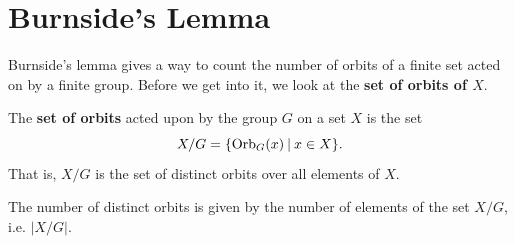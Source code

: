 \section{Burnside's Lemma}
Burnside's lemma gives a way to count the number of orbits of a finite set acted on by a finite group. Before we get into it, we look at the \textbf{set of orbits of $X$}.

\begin{definition}
    The \textbf{set of orbits} acted upon by the group $G$ on a set $X$ is the set
    \[
        X / G = \{\Orb{G}{x} \vert x \in X\}.
    \]
    That is, $X/G$ is the set of distinct orbits over all elements of $X$.
\end{definition}
\begin{remark}
    The number of distinct orbits is given by the number of elements of the set $X/G$, i.e. $|X/G|$.
\end{remark}

\newpage

